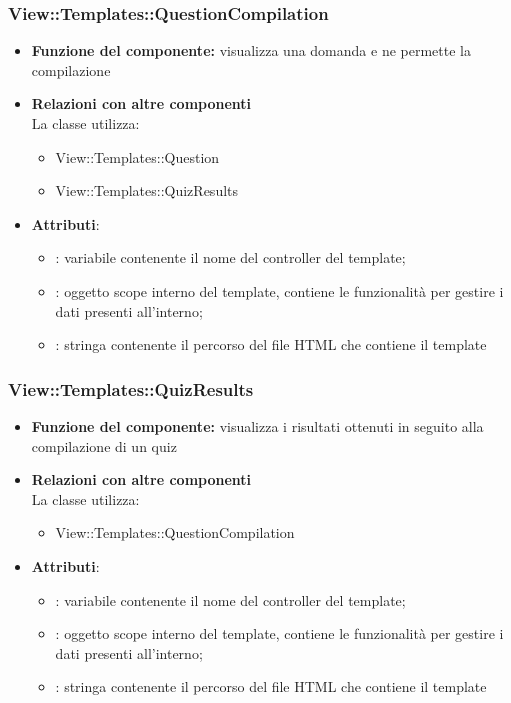  \subsubsection{View::Templates::QuestionCompilation}
 \begin{itemize}
 \item\textbf{Funzione del componente:} visualizza una domanda e ne permette la compilazione
 \item\textbf{Relazioni con altre componenti}\\
 La classe utilizza:
 	\begin{itemize}
 		\item View::Templates::Question
 		\item View::Templates::QuizResults
 	\end{itemize}
 \item\textbf{Attributi}:
 	\begin{itemize}
 		\item{}: variabile contenente il nome del controller del template;\\
		\item{}: oggetto scope interno del template, contiene le funzionalità per gestire i dati presenti all’interno;\\
		\item{}: stringa contenente il percorso del file HTML che contiene il template\\
 	\end{itemize}
 \end{itemize}
 
 \subsubsection{View::Templates::QuizResults}
 \begin{itemize}
 \item\textbf{Funzione del componente:} visualizza i risultati ottenuti in seguito alla compilazione di un quiz
 \item\textbf{Relazioni con altre componenti}\\
 La classe utilizza:
 	\begin{itemize}
 		\item View::Templates::QuestionCompilation
 	\end{itemize}
 \item\textbf{Attributi}:
 	\begin{itemize}
 		\item{}: variabile contenente il nome del controller del template;\\
		\item{}: oggetto scope interno del template, contiene le funzionalità per gestire i dati presenti all’interno;\\
		\item{}: stringa contenente il percorso del file HTML che contiene il template\\
 	\end{itemize}
 \end{itemize}
 
